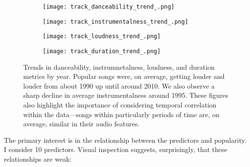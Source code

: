 \documentclass[12pt, twoside]{article}
\begin{document}
\begin{figure}[H]
\begin{subfigure}[b]{0.5\textwidth}
\centering
\texttt{[image: track\_danceability\_trend\_.png]}
\caption{}
\label{fig:danceability_trend}
\end{subfigure}
\begin{subfigure}[b]{0.5\textwidth}
\centering
\texttt{[image: track\_instrumentalness\_trend\_.png]}
\caption{}
\label{fig:instrumentalness_trend}
\end{subfigure}
\begin{subfigure}[b]{0.5\textwidth}
\centering
\texttt{[image: track\_loudness\_trend\_.png]}
\caption{}
\label{fig:loudness_trend}
\end{subfigure}
\begin{subfigure}[b]{0.5\textwidth}
\centering
\texttt{[image: track\_duration\_trend\_.png]}
\caption{}
\label{fig:duration_trend}
\end{subfigure}
\caption{Trends in danceability, instrumnetalness, loudness, and duration metrics by year. Popular songs were, on average, getting louder and louder from about 1990 up until around 2010. We also observe a sharp decline in average instrumentalness around 1995. These figures also highlight the importance of considering temporal correlation within the data---songs within particularly periods of time are, on average, similar in their audio features.}
\label{fig:multipart_figure}
\end{figure}

The primary interest is in the relationship between the predictors and popularity. I consider 10 predictors. Visual inspection suggests, surprisingly, that these relationships are weak:
\end{document}
